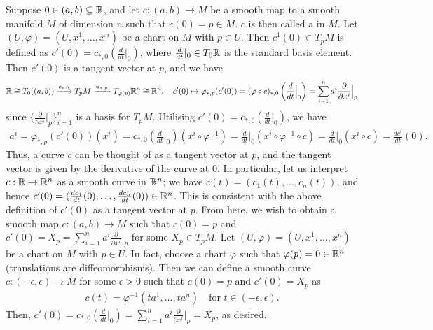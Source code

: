 Suppose $0 \in (a,b) \subseteq \mathbb{R}$, and let $c:(a,b) \to M$ be a smooth map to a smooth manifold $M$ of dimension $n$ such that $c(0) = p \in M$. $c$ is then called a  in $M$. Let $(U,\varphi) = (U,x^{1},\ldots,x^{n})$ be a chart on $M$ with $p \in U$. Then $c^{1}(0) \in T_{p}M$ is defined as $c'(0) = c_{\ast,0}\left(\frac{d}{dt}\Big|_{0}\right)$, where $\frac{d}{dt}|_{0} \in T_{0}\mathbb{R}$ is the standard basis element. Then $c'(0)$ is a tangent vector at $p$, and we have
\begin{align}
    \mathbb{R} \cong T_{0}((a,b)) \xrightarrow{c_{\ast,0}} T_{p}M \xrightarrow{\varphi_{\ast,p}} T_{\varphi(p)}\mathbb{R}^{n} \cong \mathbb{R}^{n}, \quad c'(0) \mapsto \varphi_{\ast,p}(c'(0)) = (\varphi \circ c)_{\ast,0}\left(\frac{d}{dt}\Big|_{0}\right) = \sum_{i=1}^{n} a^{i} \frac{\partial}{\partial x^{i}}\Big|_{p}
\end{align}
since $\{\frac{\partial}{\partial x^{i}} |_{p}\}_{i=1}^{n}$ is a basis for $T_{p}M$. Utilising $c'(0) = c_{\ast,0}\left(\frac{d}{dt}|_{0}\right)$, we have
\begin{align}
    a^{i} = \varphi_{\ast,p}(c'(0))(x^{i}) = c_{\ast,0}\left(\frac{d}{dt}\Big|_{0}\right)(x^{i} \circ \varphi^{-1}) = \frac{d}{dt}\Big|_{0}(x^{i} \circ \varphi^{-1} \circ c) = \frac{d}{dt}\Big|_{0}(x^{i} \circ c) = \frac{dc^{i}}{dt}(0).
\end{align}
Thus, a curve $c$ can be thought of as a tangent vector at $p$, and the tangent vector is given by the derivative of the curve at $0$. In particular, let us interpret $c:\mathbb{R} \to \mathbb{R}^{n}$ as a smooth curve in $\mathbb{R}^{n}$; we have $c(t) = (c_{1}(t),\ldots,c_{n}(t))$, and hence $c'(0) = (\frac{dc_{1}}{dt}(0),\ldots,\frac{dc_{n}}{dt}(0)) \in \mathbb{R}^{n}$. This is consistent with the above definition of $c'(0)$ as a tangent vector at $p$. From here, we wish to obtain a smooth map $c:(a,b) \to M$ such that $c(0) = p$ and $c'(0) = X_{p} = \sum_{i=1}^{n} a^{i} \frac{\partial}{\partial x^{i}}|_{p}$ for some $X_{p} \in T_{p}M$. Let $(U,\varphi) = (U,x^{1},\ldots,x^{n})$ be a chart on $M$ with $p \in U$. In fact, choose a chart $\varphi$ such that $\varphi(p) = 0 \in \mathbb{R}^{n}$ (translations are diffeomorphisms). Then we can define a smooth curve $c:(-\epsilon,\epsilon) \to M$ for some $\epsilon > 0$ such that $c(0) = p$ and $c'(0) = X_{p}$ as
\begin{align}
    c(t) = \varphi^{-1}(ta^{1},\ldots,ta^{n}) \quad \text{for } t \in (-\epsilon,\epsilon).
\end{align}
Then, $c'(0) = c_{\ast,0}\left(\frac{d}{dt}|_{0}\right) = \sum_{i=1}^{n} a^{i} \frac{\partial}{\partial x^{i}}|_{p} = X_{p}$, as desired. 

